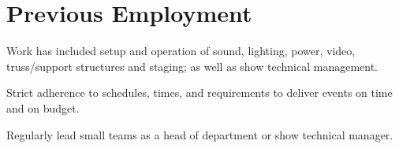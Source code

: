 \documentclass[]{deedy-resume-openfont-wjl}
\begin{document}




\vspace{-\topsep} %
\noindent\makebox[\linewidth]{\color{headings}\rule{\paperwidth}{0.1pt}}

%
%

\section{Previous Employment}




\noindent\makebox[\linewidth]{\color{headings}\rule{\paperwidth}{0.1pt}}


\begin{tightemize}
  \item Work has included setup and operation of sound, lighting, power, video, truss/support structures and staging; as well as show technical management.
  \item Strict adherence to schedules, times, and requirements to deliver events on time and on budget.
  \item Regularly lead small teams as a head of department or show technical manager.
\end{tightemize}

\noindent\makebox[\linewidth]{\color{headings}\rule{\paperwidth}{0.1pt}}


\end{document}
